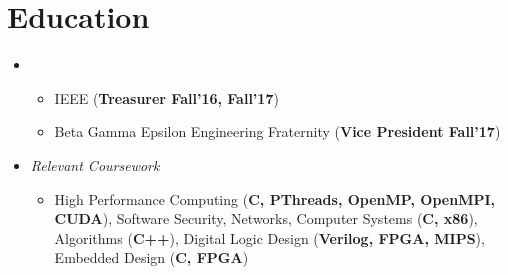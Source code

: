 \documentclass[11pt,letterpaper,sans]{moderncv}
\begin{document}
\makecvtitle

\vspace{-51pt}





\section{Education}
\vspace{1pt}


\begin{itemize}

\item[] {}
\vspace{-1mm}	\begin{itemize}
	 \item IEEE (\textbf{Treasurer Fall'16, Fall'17})
	 \item Beta Gamma Epsilon Engineering Fraternity (\textbf{Vice President Fall'17})
	\end{itemize}
	
\item[] {\textit{Relevant Coursework}}
\vspace{1pt} \begin{itemize}
               \item High Performance Computing (\textbf{C, PThreads, OpenMP, OpenMPI, CUDA}), 
               Software Security, 
               Networks,
               Computer Systems (\textbf{C, x86}),
               Algorithms (\textbf{C++}),
               Digital Logic Design 
               (\textbf{Verilog, FPGA, MIPS}), 
               Embedded Design (\textbf{C, FPGA})
              \end{itemize}


\end{itemize}
\vspace{-6pt}
\end{document}
